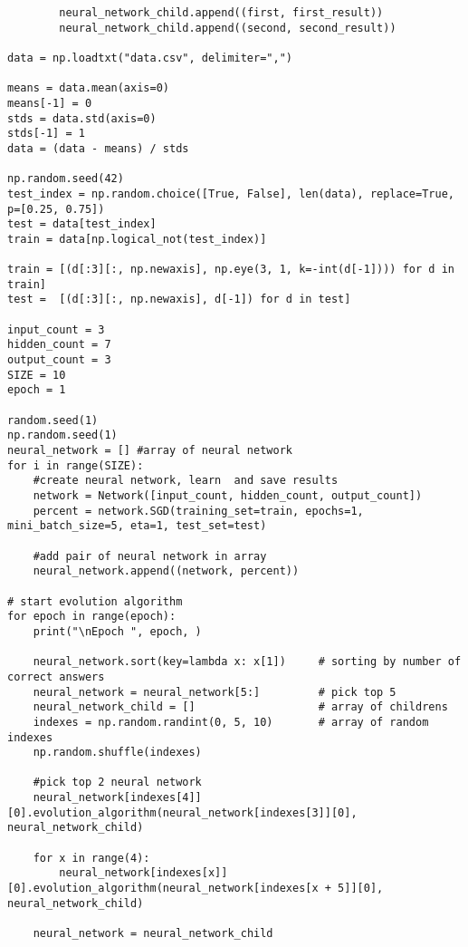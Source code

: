 \begin{lstlisting}
        neural_network_child.append((first, first_result))
        neural_network_child.append((second, second_result))

data = np.loadtxt("data.csv", delimiter=",")

means = data.mean(axis=0)
means[-1] = 0 
stds = data.std(axis=0)
stds[-1] = 1
data = (data - means) / stds

np.random.seed(42)
test_index = np.random.choice([True, False], len(data), replace=True, p=[0.25, 0.75])
test = data[test_index]
train = data[np.logical_not(test_index)]

train = [(d[:3][:, np.newaxis], np.eye(3, 1, k=-int(d[-1]))) for d in train]
test =  [(d[:3][:, np.newaxis], d[-1]) for d in test]

input_count = 3
hidden_count = 7
output_count = 3
SIZE = 10
epoch = 1

random.seed(1)
np.random.seed(1)
neural_network = [] #array of neural network
for i in range(SIZE):
    #create neural network, learn  and save results
    network = Network([input_count, hidden_count, output_count])  
    percent = network.SGD(training_set=train, epochs=1, mini_batch_size=5, eta=1, test_set=test)
    
    #add pair of neural network in array
    neural_network.append((network, percent))

# start evolution algorithm 
for epoch in range(epoch):
    print("\nEpoch ", epoch, )
    
    neural_network.sort(key=lambda x: x[1])     # sorting by number of correct answers
    neural_network = neural_network[5:]         # pick top 5
    neural_network_child = []                   # array of childrens
    indexes = np.random.randint(0, 5, 10)       # array of random indexes
    np.random.shuffle(indexes)
    
    #pick top 2 neural network
    neural_network[indexes[4]][0].evolution_algorithm(neural_network[indexes[3]][0], neural_network_child)
    
    for x in range(4):
        neural_network[indexes[x]][0].evolution_algorithm(neural_network[indexes[x + 5]][0], neural_network_child)

    neural_network = neural_network_child
\end{lstlisting}